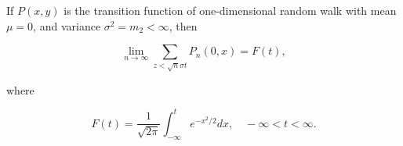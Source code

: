 If $P(x,y)$ is the transition function of one-dimensional random walk with mean $\mu = 0$, and variance $\sigma^2 = m_2 < \infty$, then

$$\lim_{n \to \infty} \sum_{z < \sqrt{n}\sigma t} P_n(0,x) = F(t),$$

where

$$F(t) = \frac{1}{\sqrt{2\pi}} \int_{-\infty}^{t} e^{-x^2/2} dx, \quad -\infty < t < \infty.$$